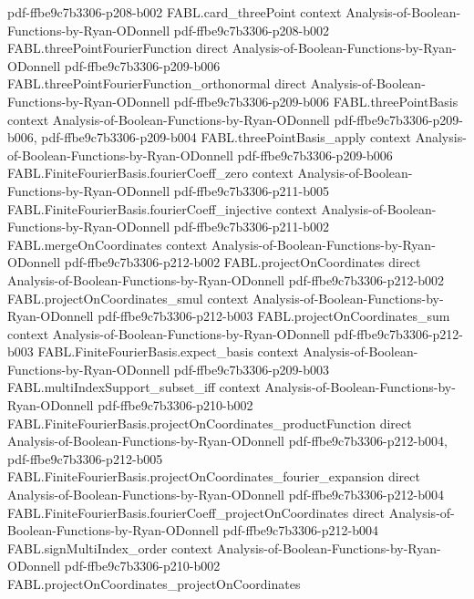 \begin{theorem}
  {pdf-ffbe9c7b3306-p208-b002}
\proofstep
  {FABL.card_threePoint}
  {context}
  {Analysis-of-Boolean-Functions-by-Ryan-ODonnell}
  {pdf-ffbe9c7b3306-p208-b002}
\proofstep
  {FABL.threePointFourierFunction}
  {direct}
  {Analysis-of-Boolean-Functions-by-Ryan-ODonnell}
  {pdf-ffbe9c7b3306-p209-b006}
\proofstep
  {FABL.threePointFourierFunction_orthonormal}
  {direct}
  {Analysis-of-Boolean-Functions-by-Ryan-ODonnell}
  {pdf-ffbe9c7b3306-p209-b006}
\proofstep
  {FABL.threePointBasis}
  {context}
  {Analysis-of-Boolean-Functions-by-Ryan-ODonnell}
  {pdf-ffbe9c7b3306-p209-b006,
    pdf-ffbe9c7b3306-p209-b004}
\proofstep
  {FABL.threePointBasis_apply}
  {context}
  {Analysis-of-Boolean-Functions-by-Ryan-ODonnell}
  {pdf-ffbe9c7b3306-p209-b006}
\proofstep
  {FABL.FiniteFourierBasis.fourierCoeff_zero}
  {context}
  {Analysis-of-Boolean-Functions-by-Ryan-ODonnell}
  {pdf-ffbe9c7b3306-p211-b005}
\proofstep
  {FABL.FiniteFourierBasis.fourierCoeff_injective}
  {context}
  {Analysis-of-Boolean-Functions-by-Ryan-ODonnell}
  {pdf-ffbe9c7b3306-p211-b002}
\proofstep
  {FABL.mergeOnCoordinates}
  {context}
  {Analysis-of-Boolean-Functions-by-Ryan-ODonnell}
  {pdf-ffbe9c7b3306-p212-b002}
\proofstep
  {FABL.projectOnCoordinates}
  {direct}
  {Analysis-of-Boolean-Functions-by-Ryan-ODonnell}
  {pdf-ffbe9c7b3306-p212-b002}
\proofstep
  {FABL.projectOnCoordinates_smul}
  {context}
  {Analysis-of-Boolean-Functions-by-Ryan-ODonnell}
  {pdf-ffbe9c7b3306-p212-b003}
\proofstep
  {FABL.projectOnCoordinates_sum}
  {context}
  {Analysis-of-Boolean-Functions-by-Ryan-ODonnell}
  {pdf-ffbe9c7b3306-p212-b003}
\proofstep
  {FABL.FiniteFourierBasis.expect_basis}
  {context}
  {Analysis-of-Boolean-Functions-by-Ryan-ODonnell}
  {pdf-ffbe9c7b3306-p209-b003}
\proofstep
  {FABL.multiIndexSupport_subset_iff}
  {context}
  {Analysis-of-Boolean-Functions-by-Ryan-ODonnell}
  {pdf-ffbe9c7b3306-p210-b002}
\proofstep
  {FABL.FiniteFourierBasis.projectOnCoordinates_productFunction}
  {direct}
  {Analysis-of-Boolean-Functions-by-Ryan-ODonnell}
  {pdf-ffbe9c7b3306-p212-b004,
    pdf-ffbe9c7b3306-p212-b005}
\proofstep
  {FABL.FiniteFourierBasis.projectOnCoordinates_fourier_expansion}
  {direct}
  {Analysis-of-Boolean-Functions-by-Ryan-ODonnell}
  {pdf-ffbe9c7b3306-p212-b004}
\proofstep
  {FABL.FiniteFourierBasis.fourierCoeff_projectOnCoordinates}
  {direct}
  {Analysis-of-Boolean-Functions-by-Ryan-ODonnell}
  {pdf-ffbe9c7b3306-p212-b004}
\proofstep
  {FABL.signMultiIndex_order}
  {context}
  {Analysis-of-Boolean-Functions-by-Ryan-ODonnell}
  {pdf-ffbe9c7b3306-p210-b002}
\proofstep
  {FABL.projectOnCoordinates_projectOnCoordinates}

\end{theorem}
